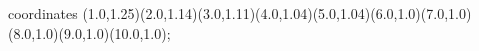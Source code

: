 					coordinates { (1.0,1.25)(2.0,1.14)(3.0,1.11)(4.0,1.04)(5.0,1.04)(6.0,1.0)(7.0,1.0)(8.0,1.0)(9.0,1.0)(10.0,1.0)};